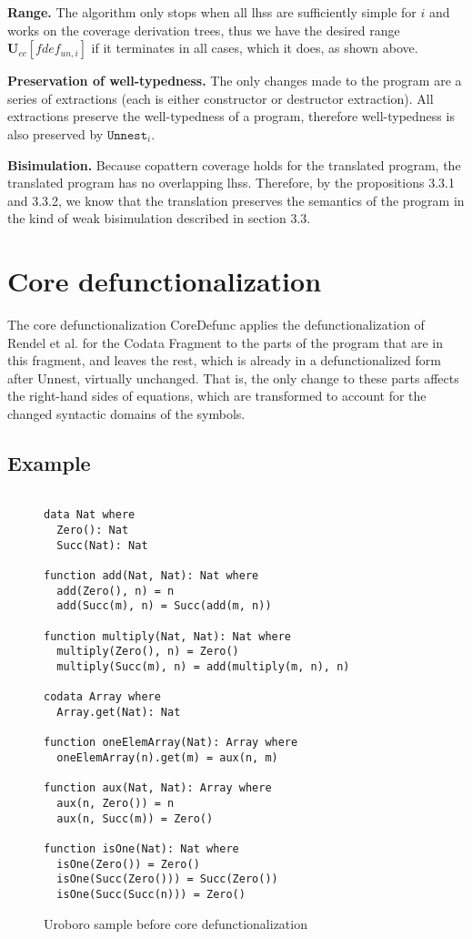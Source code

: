 \textbf{Range.} The algorithm only stops when all lhss are sufficiently simple for $i$ and works on the coverage derivation trees, thus we have the desired range $\mathbf{U}_{cc}[fdef_{un,i}]$ if it terminates in all cases, which it does, as shown above.

\textbf{Preservation of well-typedness.} The only changes made to the program are a series of extractions (each is either constructor or destructor extraction). All extractions preserve the well-typedness of a program, therefore well-typedness is also preserved by $\texttt{Unnest}_i$.

\textbf{Bisimulation.} Because copattern coverage holds for the translated program, the translated program has no overlapping lhss. Therefore, by the propositions 3.3.1 and 3.3.2, we know that the translation preserves the semantics of the program in the kind of weak bisimulation described in section 3.3.

\section{Core defunctionalization}
\label{sec:coredefunc}

The core defunctionalization \textsf{CoreDefunc} applies the defunctionalization of Rendel et al. for the Codata Fragment to the parts of the program that are in this fragment, and leaves the rest, which is already in a defunctionalized form after \textsf{Unnest}, virtually unchanged. That is, the only change to these parts affects the right-hand sides of equations, which are transformed to account for the changed syntactic domains of the symbols.

\subsection{Example}

\begin{figure}
\begin{lstlisting}

data Nat where
  Zero(): Nat
  Succ(Nat): Nat

function add(Nat, Nat): Nat where
  add(Zero(), n) = n
  add(Succ(m), n) = Succ(add(m, n))

function multiply(Nat, Nat): Nat where
  multiply(Zero(), n) = Zero()
  multiply(Succ(m), n) = add(multiply(m, n), n)

codata Array where
  Array.get(Nat): Nat

function oneElemArray(Nat): Array where
  oneElemArray(n).get(m) = aux(n, m)

function aux(Nat, Nat): Array where
  aux(n, Zero()) = n
  aux(n, Succ(m)) = Zero()

function isOne(Nat): Nat where
  isOne(Zero()) = Zero()
  isOne(Succ(Zero())) = Succ(Zero())
  isOne(Succ(Succ(n))) = Zero()

\end{lstlisting}
\caption{Uroboro sample before core defunctionalization}
\label{fig:ch4urosamplepredefunc}
\end{figure}

